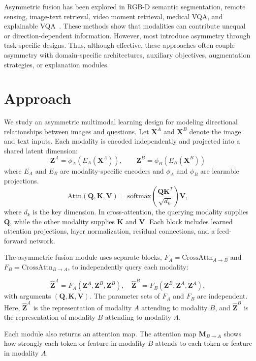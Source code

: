 \documentclass[conference]{IEEEtran}
\begin{document}
Asymmetric fusion has been explored in RGB-D semantic segmentation, remote sensing, image-text retrieval, video moment retrieval, medical VQA, and explainable VQA~\cite{du2024asymformer,aafremotesensing,ascl,asymmetricvideomoment,acma,li2025mrvqa}. These methods show that modalities can contribute unequal or direction-dependent information. However, most introduce asymmetry through task-specific designs. Thus, although effective, these approaches often couple asymmetry with domain-specific architectures, auxiliary objectives, augmentation strategies, or explanation modules.


\section{Approach}

We study an asymmetric multimodal learning design for modeling directional relationships between images and questions. Let $\mathbf{X}^{A}$ and $\mathbf{X}^{B}$ denote the image and text inputs. Each modality is encoded independently and projected into a shared latent dimension:
\[
\mathbf{Z}^{A}=\phi_A(E_A(\mathbf{X}^{A})), \qquad
\mathbf{Z}^{B}=\phi_B(E_B(\mathbf{X}^{B}))
\]
where $E_A$ and $E_B$ are modality-specific encoders and $\phi_A$ and $\phi_B$ are learnable projections.
\[
\mathrm{Attn}(\mathbf{Q},\mathbf{K},\mathbf{V})
=\mathrm{softmax}\left(\frac{\mathbf{Q}\mathbf{K}^{T}}{\sqrt{d_k}}\right)\mathbf{V},
\]
where $d_k$ is the key dimension. In cross-attention, the querying modality supplies $\mathbf{Q}$, while the other modality supplies $\mathbf{K}$ and $\mathbf{V}$. Each block includes learned attention projections, layer normalization, residual connections, and a feed-forward network.

The asymmetric fusion module uses separate blocks, $F_A=\mathrm{CrossAttn}_{A \rightarrow B}$ and $F_B=\mathrm{CrossAttn}_{B \rightarrow A}$, to independently query each modality:

\[
\widehat{\mathbf{Z}}^{A}=F_A(\mathbf{Z}^{A},\mathbf{Z}^{B},\mathbf{Z}^{B}),\quad
\widehat{\mathbf{Z}}^{B}=F_B(\mathbf{Z}^{B},\mathbf{Z}^{A},\mathbf{Z}^{A}),
\]
\noindent with arguments $(\mathbf{Q},\mathbf{K},\mathbf{V})$. The parameter sets of $F_A$ and $F_B$ are independent. Here, $\widehat{\mathbf{Z}}^A$ is the representation of modality $A$ attending to modality $B$, and $\widehat{\mathbf{Z}}^B$ is the representation of modality $B$ attending to modality $A$.

Each module also returns an attention map. The attention map $\mathbf{M}_{B \rightarrow A}$ shows how strongly each token or feature in modality $B$ attends to each token or feature in modality $A$.
\end{document}
